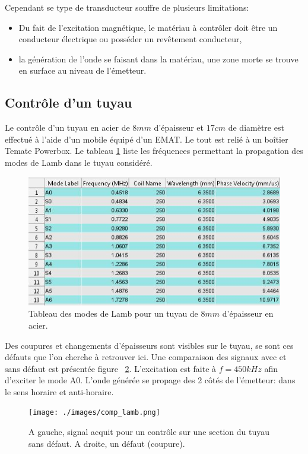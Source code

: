 \documentclass[twoside]{article}
\begin{document}
\begin{multicols}{2}
Cependant se type de transducteur souffre de plusieurs limitations:
\begin{itemize}
\item Du fait de l'excitation magnétique, le matériau à contrôler doit être un conducteur électrique ou posséder un revêtement conducteur,
\item la génération de l'onde se faisant dans la matériau, une zone morte se trouve en surface au niveau de l'émetteur.
\end{itemize}

\subsection{Contrôle d'un tuyau}
Le contrôle d'un tuyau en acier de $8 mm$ d'épaisseur et $17cm$ de diamètre est effectué à l'aide d'un mobile équipé d'un EMAT. Le tout est relié à un boîtier Temate Powerbox. Le tableau \ref{tab1} liste les fréquences permettant la propagation des modes de Lamb dans le tuyau considéré. 

\begin{figure}[H]
\centering
\includegraphics[scale=0.4]{./images/table_dispersion.jpg}
\caption{\label{tab1} Tableau des modes de Lamb pour un tuyau de $8mm$ d'épaisseur en acier.}
\end{figure}

Des coupures et changements d'épaisseurs sont visibles sur le tuyau, se sont ces défauts que l'on cherche à retrouver ici. Une comparaison des signaux avec et sans défaut est présentée figure ~\ref{fig4}. L'excitation est faite à $f = 450 kHz$ afin d'exciter le mode A0. L'onde générée se propage des 2 côtés de l'émetteur: dans le sens horaire et anti-horaire.

\begin{figure}[H]
\centering
\texttt{[image: ./images/comp\_lamb.png]}
\caption{\label{fig4} A gauche, signal acquit pour un contrôle sur une section du tuyau sans défaut. A droite, un défaut (coupure).}
\end{figure}


\end{multicols}
\end{document}
